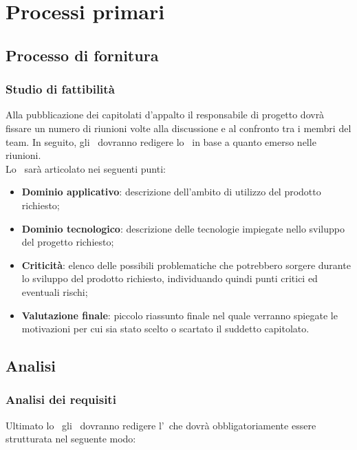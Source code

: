 \documentclass[../NormeDiProgetto.tex]{subfiles}
\begin{document}
\section{Processi primari}
   
      \subsection{Processo di fornitura}
            \subsubsection{Studio di fattibilità}
                  Alla pubblicazione dei capitolati d'appalto il responsabile di progetto dovrà fissare un numero di riunioni volte alla discussione e al confronto tra i membri del team. In seguito, gli \analisti\ dovranno redigere lo \studiodifattibilita\ in base a quanto emerso nelle riunioni. \\ Lo  \studiodifattibilita\ sarà articolato nei seguenti punti:
                  \begin{itemize}
                        \item \textbf{Dominio applicativo}: descrizione dell'ambito di utilizzo del prodotto richiesto;
                        \item \textbf{Dominio tecnologico}: descrizione delle tecnologie impiegate nello sviluppo del progetto richiesto;
                        \item \textbf{Criticità}: elenco delle possibili problematiche che potrebbero sorgere durante lo sviluppo del prodotto richiesto, individuando quindi punti critici ed eventuali rischi;
                        \item \textbf{Valutazione finale}: piccolo riassunto finale nel quale verranno spiegate le motivazioni per cui sia stato scelto o scartato il suddetto capitolato.
                  \end{itemize}

      \subsection{Analisi}
            \subsubsection{Analisi dei requisiti}
                  Ultimato lo \studiodifattibilita\ gli \analisti\ dovranno redigere l'\analisideirequisiti\ che dovrà obbligatoriamente essere strutturata nel seguente modo:
                  
\end{document}
